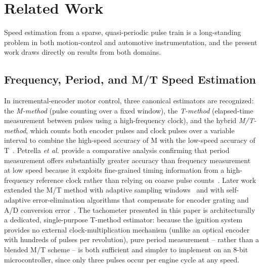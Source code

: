 \documentclass[journal, twocolumn]{IEEEtran}
\begin{document}
\section{Related Work}
\label{sec:related}
Speed estimation from a sparse, quasi-periodic pulse train is a long-standing problem in both motion-control and automotive instrumentation, and the present work draws directly on results from both domains.

\subsection{Frequency, Period, and M/T Speed Estimation}
In incremental-encoder motor control, three canonical estimators are recognized: the \emph{M-method} (pulse counting over a fixed window), the \emph{T-method} (elapsed-time measurement between pulses using a high-frequency clock), and the hybrid \emph{M/T-method}, which counts both encoder pulses and clock pulses over a variable interval to combine the high-speed accuracy of M with the low-speed accuracy of T~\cite{motorcontrolpatent,mtmethod2017}. Petrella \emph{et al.} provide a comparative analysis confirming that period measurement offers substantially greater accuracy than frequency measurement at low speed because it exploits fine-grained timing information from a high-frequency reference clock rather than relying on coarse pulse counts~\cite{petrella2007}. Later work extended the M/T method with adaptive sampling windows~\cite{mtmethod_springer} and with self-adaptive error-elimination algorithms that compensate for encoder grating and A/D conversion error~\cite{mtmethod2017}. The tachometer presented in this paper is architecturally a dedicated, single-purpose T-method estimator: because the ignition system provides no external clock-multiplication mechanism (unlike an optical encoder with hundreds of pulses per revolution), pure period measurement -- rather than a blended M/T scheme -- is both sufficient and simpler to implement on an 8-bit microcontroller, since only three pulses occur per engine cycle at any speed.
\end{document}
